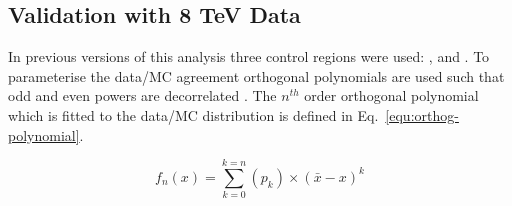 \subsection{Validation with 8 TeV Data}
\label{sec:valid8}
In previous versions of this analysis three control regions
were used: \mj, \mmj and \gj. To parameterise the data/MC agreement
orthogonal polynomials are used such that odd and even powers 
are decorrelated \cite{cohen2013applied}. 
The $n^{th}$ order orthogonal polynomial which is fitted to the data/MC 
distribution is defined in Eq.~\ref{equ:orthog-polynomial}.

\begin{equation}
  \label{equ:orthog-polynomial}
  f_n(x) = \sum_{k=0}^{k=n}{(p_k)\times(\bar{x}-x)^k}
\end{equation}

